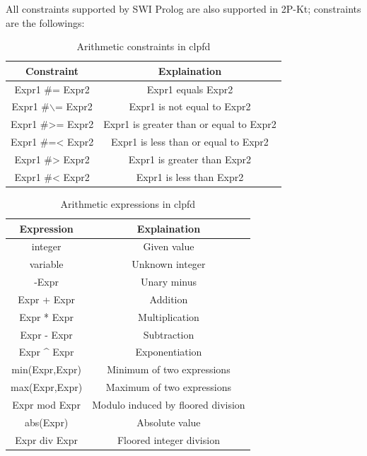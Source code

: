 All constraints supported by SWI Prolog are also supported in 2P-Kt; constraints are the followings:\newpage
\begin{center}
    \begin{table}
        \begin{tabular}{||c c ||} 
        \hline
        Constraint & Explaination \\ [0.5ex] 
        \hline\hline
        Expr1 \#= Expr2	& Expr1 equals Expr2 \\ 
        \hline
        Expr1 \#$\backslash$= Expr2 & Expr1 is not equal to Expr2 \\
        \hline
        Expr1 \#>= Expr2 & Expr1 is greater than or equal to Expr2\\
        \hline
        Expr1 \#=< Expr2 & Expr1 is less than or equal to Expr2 \\
        \hline
        Expr1 \#> Expr2	& Expr1 is greater than Expr2 \\
        \hline
        Expr1 \#< Expr2	& Expr1 is less than Expr2 \\
        \hline
        \end{tabular}
        \label{table:arithmetic_constraints}
        \caption{Arithmetic constraints in clpfd}
    \end{table}    
\end{center}

\begin{center}
    \begin{table}
        \begin{tabular}{||c c ||} 
        \hline
        Expression & Explaination \\ [0.5ex] 
        \hline\hline
        integer	& Given value \\ 
        \hline
        variable & Unknown integer \\
        \hline
        -Expr & Unary minus\\
        \hline
        Expr + Expr	 & Addition \\
        \hline
        Expr * Expr	& Multiplication \\
        \hline
        Expr - Expr	& Subtraction \\
        \hline
        Expr \^{} Expr& Exponentiation \\
        \hline
        min(Expr,Expr) & Minimum of two expressions \\
        \hline
        max(Expr,Expr) & Maximum of two expressions \\
        \hline
        Expr mod Expr & Modulo induced by floored division \\
        \hline
        abs(Expr) & Absolute value \\
        \hline
        Expr div Expr & Floored integer division \\
        \hline
        \end{tabular}
        \label{table:expressions_clp}
        \caption{Arithmetic expressions in clpfd}
    \end{table}    
\end{center}

